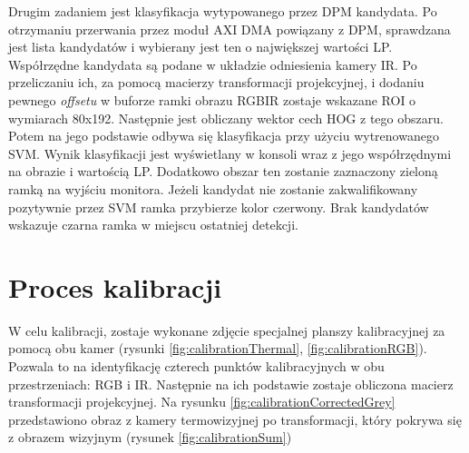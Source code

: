 Drugim zadaniem jest klasyfikacja wytypowanego przez DPM kandydata. Po otrzymaniu przerwania przez moduł AXI DMA powiązany z DPM, sprawdzana jest lista kandydatów i wybierany jest ten o największej wartości LP. Współrzędne kandydata są podane w układzie odniesienia kamery IR. Po przeliczaniu ich, za pomocą macierzy transformacji projekcyjnej, i dodaniu pewnego \textit{offsetu} w buforze ramki obrazu RGBIR zostaje wskazane ROI o wymiarach 80x192. Następnie jest obliczany wektor cech HOG z tego obszaru. Potem na jego podstawie odbywa się klasyfikacja przy użyciu wytrenowanego SVM. Wynik klasyfikacji jest wyświetlany w konsoli wraz z jego współrzędnymi na obrazie i wartością LP. Dodatkowo obszar ten zostanie zaznaczony zieloną ramką na wyjściu monitora. Jeżeli kandydat nie zostanie zakwalifikowany pozytywnie przez SVM ramka przybierze kolor czerwony. Brak kandydatów wskazuje czarna ramka w miejscu ostatniej detekcji. 
\section{Proces kalibracji}
W celu kalibracji, zostaje wykonane zdjęcie specjalnej planszy kalibracyjnej za pomocą obu kamer (rysunki \ref{fig:calibrationThermal}, \ref{fig:calibrationRGB}). Pozwala to na identyfikację czterech punktów kalibracyjnych w obu przestrzeniach: RGB i IR. Następnie na ich podstawie zostaje obliczona macierz transformacji projekcyjnej. Na rysunku \ref{fig:calibrationCorrectedGrey} przedstawiono obraz z kamery termowizyjnej po transformacji, który pokrywa się z obrazem wizyjnym (rysunek \ref{fig:calibrationSum})


